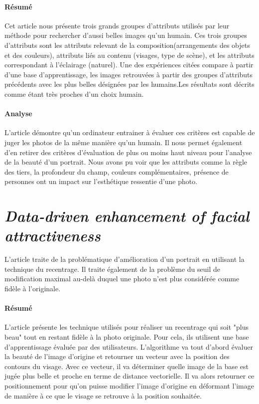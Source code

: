 \documentclass[11pt, french]{report-rd-info}
\begin{document}
\paragraph{Résumé}
Cet article nous présente trois grands groupes d'attributs utilisés par leur méthode pour rechercher d'aussi belles images qu'un humain.
Ces trois groupes d'attributs sont les attributs relevant de la composition(arrangements des objets et des couleurs), attributs liés au contenu (visages, type de scène), et les attributs correspondant à l'éclairage (naturel).
Une des expériences citées compare à partir d'une base d'apprentissage, les images retrouvées à partir des groupes d'attributs précédents avec les plus belles désignées par les humains.Les résultats sont décrits comme étant très proches d'un choix humain.

\paragraph{Analyse}
L'article démontre qu'un ordinateur entrainer à évaluer ces critères est capable de juger les photos de la même manière qu'un humain.
Il nous permet également d'en retirer des critères d'évaluation de plus ou moins haut niveau pour l'analyse de la beauté d'un portrait.
Nous avons pu voir que les attributs comme la règle des tiers, la profondeur du champ, couleurs complémentaires, présence de personnes ont un impact sur l'esthétique ressentie d'une photo.

\section{\emph{Data-driven enhancement of facial attractiveness}}
L'article \cite{Leyvand2008} traite de la problématique d'amélioration d'un portrait en utilisant la technique du recentrage. Il traite également de la problème du seuil de modification maximal au-delà duquel une photo n'est plus considérée comme fidèle à l'originale.

\paragraph{Résumé}
L'article présente les technique utilisés pour réaliser un recentrage qui soit "plus beau" tout en restant fidèle à la photo originale. Pour cela, ils utilisent une base d'apprentissage évaluée par des utilisateurs.
L'algorithme va tout d'abord évaluer la beauté de l'image d'origine et retourner un vecteur avec la position des contours du visage. Avec ce vecteur, il va déterminer quelle image de la base est jugée plus belle et proche en terme de distance vectorielle. Il va alors retourner ce positionnement pour qu'on puisse modifier l'image d'origine en déformant l'image de manière à ce que le visage se retrouve à la position souhaitée. 
\end{document}
